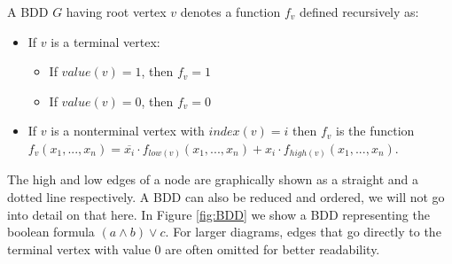 \begin{mydef}
A BDD $G$ having root vertex $v$ denotes a function $f_v$ defined recursively as:
\begin{itemize}
\item If $v$ is a terminal vertex:
\begin{itemize}
\item If $value(v)=1$, then $f_v=1$
\item If $value(v)=0$, then $f_v=0$
\end{itemize}
\item If $v$ is a nonterminal vertex with $index(v)=i$ then $f_v$ is the function
$f_v(x_1,...,x_n) = \overline{x_i}\cdot f_{low(v)}(x_1,...,x_n)+x_i\cdot f_{high(v)}(x_1,...,x_n)$.
\end{itemize}
\end{mydef}

The high and low edges of a node are graphically shown as a straight and a dotted line respectively. A BDD can also be reduced and ordered, we will not go into detail on that here. In Figure \ref{fig:BDD} we show a BDD representing the boolean formula $(a \wedge b) \vee c$. For larger diagrams, edges that go directly to the terminal vertex with value $0$ are often omitted for better readability. 